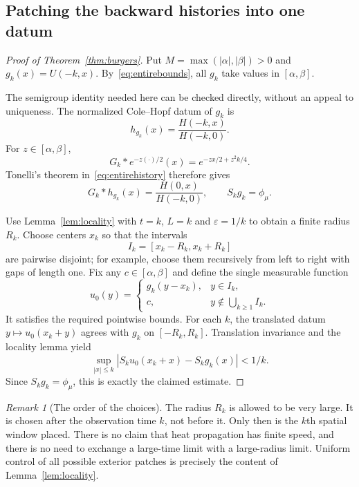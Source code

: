 \documentclass[11pt,a4paper]{article}
\numberwithin{equation}{section}
\theoremstyle{remark}\newtheorem{remark}[theorem]{Remark}
\begin{document}
\subsection{Patching the backward histories into one datum}
\begin{proof}[Proof of Theorem~\ref{thm:burgers}]
Put $M=\max(|\alpha|,|\beta|)>0$ and $g_k(x)=U(-k,x)$. By~\eqref{eq:entirebounds}, all $g_k$ take values in $[\alpha,\beta]$.

The semigroup identity needed here can be checked directly, without an appeal to uniqueness. The normalized Cole--Hopf datum of $g_k$ is
\[
 h_{g_k}(x)=\frac{H(-k,x)}{H(-k,0)}.
\]
For $z\in[\alpha,\beta]$,
\[
 G_k*e^{-z(\cdot)/2}(x)=e^{-zx/2+z^2k/4}.
\]
Tonelli's theorem in~\eqref{eq:entirehistory} therefore gives
\[
 G_k*h_{g_k}(x)=\frac{H(0,x)}{H(-k,0)},
 \qquad S_kg_k=\phi_\mu.
\]

Use Lemma~\ref{lem:locality} with $t=k$, $L=k$ and $\varepsilon=1/k$ to obtain a finite radius $R_k$. Choose centers $x_k$ so that the intervals
\[
 I_k=[x_k-R_k,x_k+R_k]
\]
are pairwise disjoint; for example, choose them recursively from left to right with gaps of length one. Fix any $c\in[\alpha,\beta]$ and define the single measurable function
\begin{equation}\label{eq:patched-data}
 u_0(y)=
 \begin{cases}
 g_k(y-x_k),&y\in I_k,\\
 c,&y\notin\bigcup_{k\geq1}I_k.
 \end{cases}
\end{equation}
It satisfies the required pointwise bounds. For each $k$, the translated datum $y\mapsto u_0(x_k+y)$ agrees with $g_k$ on $[-R_k,R_k]$. Translation invariance and the locality lemma yield
\[
 \sup_{|x|\leq k}|S_ku_0(x_k+x)-S_kg_k(x)|<1/k.
\]
Since $S_kg_k=\phi_\mu$, this is exactly the claimed estimate.
\end{proof}

\begin{remark}[The order of the choices]
The radius $R_k$ is allowed to be very large. It is chosen after the observation time $k$, not before it. Only then is the $k$th spatial window placed. There is no claim that heat propagation has finite speed, and there is no need to exchange a large-time limit with a large-radius limit. Uniform control of all possible exterior patches is precisely the content of Lemma~\ref{lem:locality}.
\end{remark}
\end{document}
